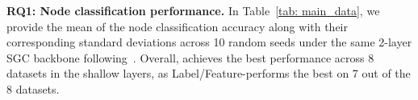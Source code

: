 \textbf{RQ1: Node classification performance.}
In Table~\ref{tab: main_data}, we provide the mean of the node classification accuracy along with their corresponding standard deviations across 10 random seeds under the same 2-layer SGC backbone following~\citet{dgc}.
Overall, \ours achieves the best performance across $8$ datasets in the shallow layers, as Label/Feature-\ours performs the best on 7 out of the 8 datasets. 


